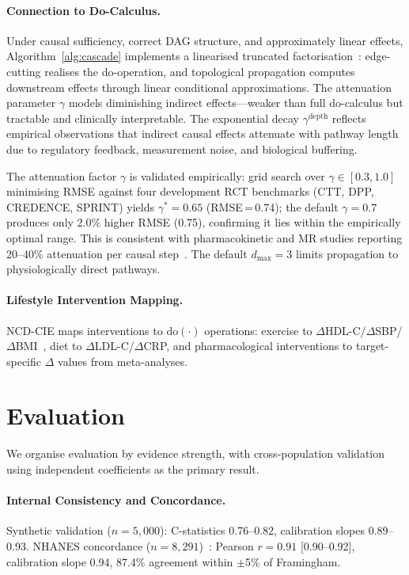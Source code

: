 \documentclass[runningheads]{llncs}
\begin{document}
\paragraph{Connection to Do-Calculus.}
Under causal sufficiency, correct DAG structure, and approximately
linear effects, Algorithm~\ref{alg:cascade} implements a linearised
truncated factorisation~\cite{pearl2009causality}: edge-cutting
realises the do-operation, and topological propagation computes
downstream effects through linear conditional approximations.
The attenuation parameter $\gamma$ models diminishing indirect
effects---weaker than full do-calculus but tractable and clinically
interpretable.
The exponential decay $\gamma^{\text{depth}}$ reflects empirical
observations that indirect causal effects attenuate with pathway
length due to regulatory feedback, measurement noise, and biological
buffering.

The attenuation factor $\gamma$ is validated empirically: grid
search over $\gamma \in [0.3, 1.0]$ minimising RMSE against four
development RCT benchmarks (CTT, DPP, CREDENCE, SPRINT) yields
$\gamma^* = 0.65$ (RMSE\,=\,0.74);
the default $\gamma = 0.7$ produces only 2.0\% higher RMSE
(0.75), confirming it lies within the empirically optimal range.
This is consistent with pharmacokinetic and MR studies reporting
20--40\% attenuation per causal
step~\cite{ctt2010,pearl2009causality}.
The default $d_{\max} = 3$ limits propagation to physiologically
direct pathways.

\paragraph{Lifestyle Intervention Mapping.}
NCD-CIE maps interventions to $\mathrm{do}(\cdot)$ operations:
exercise to $\Delta$HDL-C/$\Delta$SBP/$\Delta$BMI~\cite{naci2019comparative},
diet to $\Delta$LDL-C/$\Delta$CRP, and pharmacological
interventions to target-specific $\Delta$ values from
meta-analyses.

\section{Evaluation}\label{sec:validation}

We organise evaluation by evidence strength, with cross-population
validation using independent coefficients as the primary result.

\paragraph{Internal Consistency and Concordance.}
Synthetic validation ($n = 5{,}000$): C-statistics 0.76--0.82,
calibration slopes 0.89--0.93.
NHANES concordance ($n = 8{,}291$)~\cite{nhanes2020}:
Pearson $r = 0.91$ [0.90--0.92], calibration slope 0.94,
87.4\% agreement within $\pm$5\% of Framingham.
\end{document}
